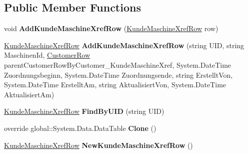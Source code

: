 \subsection*{Public Member Functions}
\begin{DoxyCompactItemize}
\item 
void {\bfseries Add\+Kunde\+Maschine\+Xref\+Row} (\hyperlink{class_products_1_1_data_1_1ds_sage_1_1_kunde_maschine_xref_row}{Kunde\+Maschine\+Xref\+Row} row)\hypertarget{class_products_1_1_data_1_1ds_sage_1_1_kunde_maschine_xref_data_table_a327a66d2694b4b173b1c8496c654c289}{}\label{class_products_1_1_data_1_1ds_sage_1_1_kunde_maschine_xref_data_table_a327a66d2694b4b173b1c8496c654c289}

\item 
\hyperlink{class_products_1_1_data_1_1ds_sage_1_1_kunde_maschine_xref_row}{Kunde\+Maschine\+Xref\+Row} {\bfseries Add\+Kunde\+Maschine\+Xref\+Row} (string U\+ID, string Maschinen\+Id, \hyperlink{class_products_1_1_data_1_1ds_sage_1_1_customer_row}{Customer\+Row} parent\+Customer\+Row\+By\+Customer\+\_\+\+Kunde\+Maschine\+Xref, System.\+Date\+Time Zuordnungsbeginn, System.\+Date\+Time Zuordnungsende, string Erstellt\+Von, System.\+Date\+Time Erstellt\+Am, string Aktualisiert\+Von, System.\+Date\+Time Aktualisiert\+Am)\hypertarget{class_products_1_1_data_1_1ds_sage_1_1_kunde_maschine_xref_data_table_a91c18d5f14b195a409a7b34302bac776}{}\label{class_products_1_1_data_1_1ds_sage_1_1_kunde_maschine_xref_data_table_a91c18d5f14b195a409a7b34302bac776}

\item 
\hyperlink{class_products_1_1_data_1_1ds_sage_1_1_kunde_maschine_xref_row}{Kunde\+Maschine\+Xref\+Row} {\bfseries Find\+By\+U\+ID} (string U\+ID)\hypertarget{class_products_1_1_data_1_1ds_sage_1_1_kunde_maschine_xref_data_table_a685c181a9241065736026a9295617b74}{}\label{class_products_1_1_data_1_1ds_sage_1_1_kunde_maschine_xref_data_table_a685c181a9241065736026a9295617b74}

\item 
override global\+::\+System.\+Data.\+Data\+Table {\bfseries Clone} ()\hypertarget{class_products_1_1_data_1_1ds_sage_1_1_kunde_maschine_xref_data_table_a06f28932e08131277d3ed9354af7788e}{}\label{class_products_1_1_data_1_1ds_sage_1_1_kunde_maschine_xref_data_table_a06f28932e08131277d3ed9354af7788e}

\item 
\hyperlink{class_products_1_1_data_1_1ds_sage_1_1_kunde_maschine_xref_row}{Kunde\+Maschine\+Xref\+Row} {\bfseries New\+Kunde\+Maschine\+Xref\+Row} ()\hypertarget{class_products_1_1_data_1_1ds_sage_1_1_kunde_maschine_xref_data_table_a0f28bb56fe32ca15091529df5a242db7}{}\label{class_products_1_1_data_1_1ds_sage_1_1_kunde_maschine_xref_data_table_a0f28bb56fe32ca15091529df5a242db7}


\end{DoxyCompactItemize}
